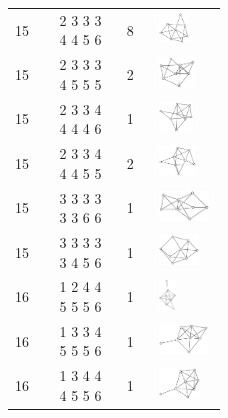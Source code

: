 \begin{footnotesize}
\begin{longtable}{m{0.07\linewidth} m{0.15\linewidth} m{0.05\linewidth} m{0.15\linewidth}}
15 & 2 3 3 3 4 4 5 6 & 8 & \includegraphics[height=0.8cm]{15-universal-graphs/img/degree-sequences-example-graphs/graph-4-8-124}\\
15 & 2 3 3 3 4 5 5 5 & 2 & \includegraphics[height=0.8cm]{15-universal-graphs/img/degree-sequences-example-graphs/graph-4-8-125}\\
15 & 2 3 3 4 4 4 4 6 & 1 & \includegraphics[height=0.8cm]{15-universal-graphs/img/degree-sequences-example-graphs/graph-4-8-126}\\
15 & 2 3 3 4 4 4 5 5 & 2 & \includegraphics[height=0.8cm]{15-universal-graphs/img/degree-sequences-example-graphs/graph-4-8-127}\\
15 & 3 3 3 3 3 3 6 6 & 1 & \includegraphics[height=0.8cm]{15-universal-graphs/img/degree-sequences-example-graphs/graph-4-8-128}\\
15 & 3 3 3 3 3 4 5 6 & 1 & \includegraphics[height=0.8cm]{15-universal-graphs/img/degree-sequences-example-graphs/graph-4-8-129}\\
16 & 1 2 4 4 5 5 5 6 & 1 & \includegraphics[height=0.8cm]{15-universal-graphs/img/degree-sequences-example-graphs/graph-4-8-130}\\
16 & 1 3 3 4 5 5 5 6 & 1 & \includegraphics[height=0.8cm]{15-universal-graphs/img/degree-sequences-example-graphs/graph-4-8-131}\\
16 & 1 3 4 4 4 5 5 6 & 1 & \includegraphics[height=0.8cm]{15-universal-graphs/img/degree-sequences-example-graphs/graph-4-8-132}\\

\end{longtable}
\end{footnotesize}
